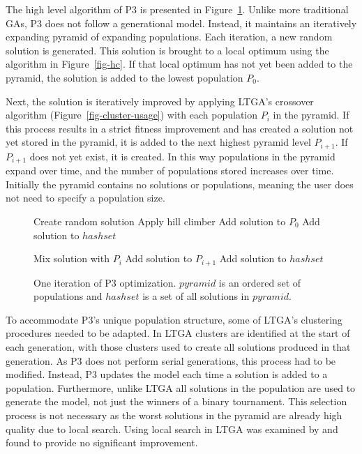 \documentclass[twoside]{article}
\begin{document}
The high level algorithm of P3 is presented in Figure~\ref{fig-p3}. Unlike more traditional
GAs, P3 does not follow a generational model. Instead, it maintains an iteratively
expanding pyramid of expanding populations. Each iteration, a new random solution is generated.
This solution is brought to a local optimum using the algorithm in Figure~\ref{fig-hc}. If that
local optimum has not yet been added to the pyramid, the solution is added to the lowest
population $P_0$.

Next, the solution is iteratively improved by applying LTGA's crossover algorithm (Figure~\ref{fig-cluster-usage})
with each population $P_i$ in the pyramid. If this process results in a strict fitness improvement and has
created a solution not yet stored in the pyramid, it is added to the next highest pyramid level $P_{i+1}$.
If $P_{i+1}$ does not yet exist, it is created. In this way populations in the pyramid expand over time,
and the number of populations stored increases over time. Initially the pyramid contains no solutions
or populations, meaning the user does not need to specify a population size.


\begin{figure}
  \begin{algorithmic}[1]
    \State Create random solution
    \State Apply hill climber
      \State Add solution to $P_0$
      \State Add solution to $hashset$
    \EndIf

      \State Mix solution with $P_i$
          \State Add solution to $P_{i+1}$
          \State Add solution to $hashset$
        \EndIf
      \EndIf
    \EndFor
  \EndProcedure
\end{algorithmic}
  \caption{One iteration of P3 optimization. $pyramid$ is an
           ordered set of populations and $hashset$ is a set
           of all solutions in $pyramid$.}
  \label{fig-p3}
\end{figure}

To accommodate P3's unique population structure, some of LTGA's clustering procedures needed
to be adapted. In LTGA
clusters are identified at the start of each generation, with those clusters used
to create all solutions produced in that generation. As P3 does not perform serial
generations, this process had to be modified. Instead, P3 updates the model each
time a solution is added to a population. Furthermore, unlike
LTGA all solutions in the population are used to generate the model, not just the
winners of a binary tournament. This selection process is not necessary as the
worst solutions in the pyramid are already high quality due to local search.
Using local search in LTGA was examined by \cite{bosman:2011:lsbbo} and found
to provide no significant improvement.
\end{document}
